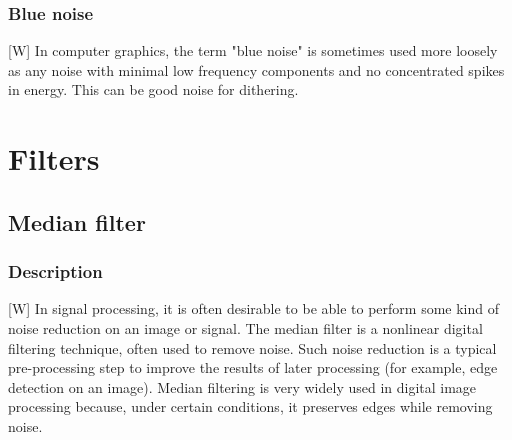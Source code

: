 \documentclass[12pt]{article}
\begin{document}
	\subsubsection{Blue noise}
	[W] In computer graphics, the term "blue noise" is sometimes used more loosely as any noise with 
	minimal low frequency components and no concentrated spikes in energy. This can be good noise for dithering.
%	
%	
\section{Filters}
	
	\subsection{Median filter}
	\subsubsection{Description}
	[W] In signal processing, it is often desirable to be able to perform some kind of noise 
	reduction on an image or signal. The median filter is a nonlinear digital filtering 
	technique, often used to remove noise. Such noise reduction is a typical pre-processing 
	step to improve the results of later processing (for example, edge detection on an image). 
	Median filtering is very widely used in digital image processing because, under certain 
	conditions, it preserves edges while removing noise.
	
\end{document}
